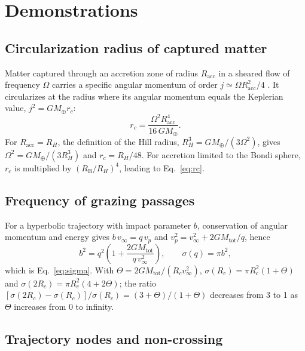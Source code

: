 \documentclass[11pt,a4paper,openany]{report}
\newcommand{\Mt}{M_{\oplus}}
\newcommand{\Mtot}{M_{\mathrm{tot}}}
\begin{document}
\appendix

\chapter{Demonstrations}
\label{app:demo}

\section{Circularization radius of captured matter}
\label{app:rc}

Matter captured through an accretion zone of radius $R_{\mathrm{acc}}$ in a sheared flow of
frequency $\Omega$ carries a specific angular momentum of order $j\simeq\Omega R_{\mathrm{acc}}^2/4$
\cite{QuillenTrilling1998}. It circularizes at the radius where its angular momentum equals the
Keplerian value, $j^2=G\Mt r_c$:
\begin{equation}
r_c=\frac{\Omega^2R_{\mathrm{acc}}^4}{16\,G\Mt}.
\end{equation}
For $R_{\mathrm{acc}}=R_H$, the definition of the Hill radius, $R_H^3=G\Mt/(3\Omega^2)$, gives
$\Omega^2=G\Mt/(3R_H^3)$ and $r_c=R_H/48$. For accretion limited to the Bondi sphere, $r_c$ is
multiplied by $(R_{\mathrm{B}}/R_H)^4$, leading to Eq.~\eqref{eq:rc}.

\section{Frequency of grazing passages}

For a hyperbolic trajectory with impact parameter $b$, conservation of angular momentum and energy
gives $b\,v_\infty=q\,v_p$ and $v_p^2=v_\infty^2+2G\Mtot/q$, hence
\begin{equation}
b^2=q^2\left(1+\frac{2G\Mtot}{q\,v_\infty^2}\right),\qquad \sigma(q)=\pi b^2,
\end{equation}
which is Eq.~\eqref{eq:sigma}. With $\Theta=2G\Mtot/(R_cv_\infty^2)$,
$\sigma(R_c)=\pi R_c^2(1+\Theta)$ and $\sigma(2R_c)=\pi R_c^2(4+2\Theta)$; the ratio
$[\sigma(2R_c)-\sigma(R_c)]/\sigma(R_c)=(3+\Theta)/(1+\Theta)$ decreases from 3 to 1 as $\Theta$
increases from 0 to infinity.

\section{Trajectory nodes and non-crossing}
\end{document}
